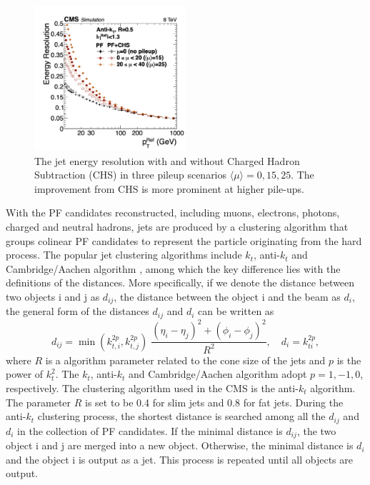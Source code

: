 \begin{figure}[ht]
    \centering
    \includegraphics[width=0.5\textwidth]{chapters/CMSExperiment/sectionReconstruction/figures/jetres_pf_chs}
    \caption{ The jet energy resolution \cite{cms:particleflow:Sirunyan:2017ulk} with and without Charged Hadron Subtraction (CHS) in three pileup scenarios $\langle \mu\rangle =0,15,25$. The improvement from CHS is more prominent at higher pile-ups.  }
    \label{fig:cmsExperiment:reconstruction:resJet}
\end{figure}



With the PF candidates reconstructed, including muons, electrons, photons, charged and neutral hadrons, jets are produced by a clustering algorithm that groups colinear PF candidates to represent the particle originating from the hard process. The popular jet clustering algorithms include $k_t$, anti-$k_t$ and Cambridge/Aachen algorithm \cite{tech:antikt:Cacciari:2008gp}, among which the key difference lies with the definitions of the distances. More specifically, if we denote the distance between two objects i and j as $d_{ij}$, the distance between the object i and the beam as $d_i$,  the general form of the distances $d_{ij}$ and $d_i$ can be written as
\begin{equation}
	d_{ij} = \min(k_{t,i}^{2p}, k_{t,j}^{2p}) \; \frac{(\eta_i-\eta_j) ^2 + (\phi_i-\phi_j) ^2}{R^2} , \quad d_i =k_{ti}^{2p},
\end{equation}
\noindent where $R$ is a algorithm parameter related to the cone size of the jets and $p$ is the power of $k_t^2$. The $k_t$, anti-$k_t$ and Cambridge/Aachen algorithm adopt $p=1,-1,0$, respectively. The clustering algorithm used in the CMS is the anti-$k_t$ algorithm. The parameter $R$ is set to be 0.4 for slim jets and 0.8 for fat jets. During the anti-$k_t$ clustering process, the shortest distance is searched among all the $d_{ij}$ and $d_i$ in the collection of PF candidates. If the minimal distance is $d_{ij}$, the two object i and j are merged into a new object. Otherwise, the minimal distance is $d_{i}$ and the object i is output as a jet. This process is repeated until all objects are output. 

